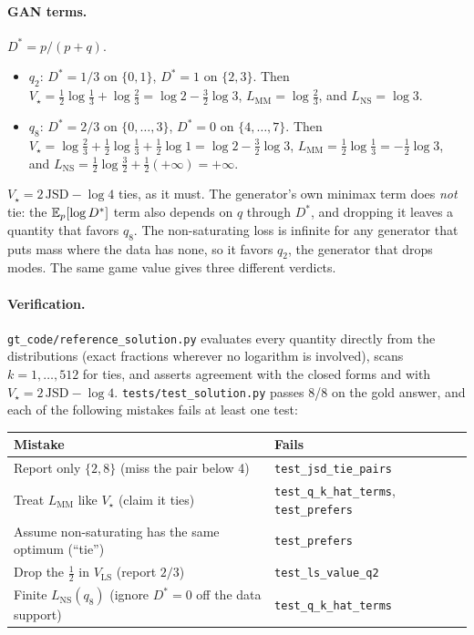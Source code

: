 \paragraph{GAN terms.} \(D^*=p/(p+q)\).
\begin{itemize}
  \item \(q_2\): \(D^*=1/3\) on \(\{0,1\}\), \(D^*=1\) on \(\{2,3\}\).
  Then \(V_\star=\tfrac12\log\tfrac13+\log\tfrac23=\log2-\tfrac32\log3\),
  \(L_{\mathrm{MM}}=\log\tfrac23\), and \(L_{\mathrm{NS}}=\log3\).
  \item \(q_8\): \(D^*=2/3\) on \(\{0,\dots,3\}\), \(D^*=0\) on \(\{4,\dots,7\}\).
  Then \(V_\star=\log\tfrac23+\tfrac12\log\tfrac13+\tfrac12\log1=\log2-\tfrac32\log3\),
  \(L_{\mathrm{MM}}=\tfrac12\log\tfrac13=-\tfrac12\log3\), and
  \(L_{\mathrm{NS}}=\tfrac12\log\tfrac32+\tfrac12(+\infty)=+\infty\).
\end{itemize}
\(V_\star=2\,\mathrm{JSD}-\log4\) ties, as it must. The generator's own minimax
term does \emph{not} tie: the \(\mathbb{E}_p[\log D^*]\) term also depends on \(q\)
through \(D^*\), and dropping it leaves a quantity that favors \(q_8\). The
non-saturating loss is infinite for any generator that puts mass where the
data has none, so it favors \(q_2\), the generator that drops modes. The same
game value gives three different verdicts.

\paragraph{Verification.} \texttt{gt\_code/reference\_solution.py} evaluates
every quantity directly from the distributions (exact fractions wherever no
logarithm is involved), scans \(k=1,\dots,512\) for ties, and asserts
agreement with the closed forms and with \(V_\star=2\,\mathrm{JSD}-\log4\).
\texttt{tests/test\_solution.py} passes 8/8 on the gold answer, and each of
the following mistakes fails at least one test:
\begin{center}
\begin{tabular}{@{}ll@{}}
\toprule
Mistake & Fails\\
\midrule
Report only \(\{2,8\}\) (miss the pair below 4) & \texttt{test\_jsd\_tie\_pairs}\\
Treat \(L_{\mathrm{MM}}\) like \(V_\star\) (claim it ties) & \texttt{test\_q\_k\_hat\_terms}, \texttt{test\_prefers}\\
Assume non-saturating has the same optimum (``tie'') & \texttt{test\_prefers}\\
Drop the \(\tfrac12\) in \(V_{\mathrm{LS}}\) (report \(2/3\)) & \texttt{test\_ls\_value\_q2}\\
Finite \(L_{\mathrm{NS}}(q_8)\) (ignore \(D^*=0\) off the data support) & \texttt{test\_q\_k\_hat\_terms}\\
\bottomrule
\end{tabular}
\end{center}

